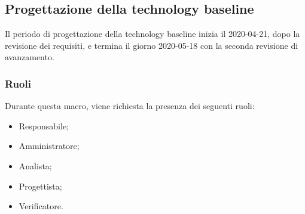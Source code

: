 \documentclass[../piano-di-progetto.tex]{subfiles}
\begin{document}
\subsection{Progettazione della technology baseline}
Il periodo di progettazione della technology baseline inizia il 2020-04-21, dopo la revisione dei requisiti, e termina il giorno 2020-05-18 con la seconda revisione di avanzamento. 

\subsubsection{Ruoli}
Durante questa macro, viene richiesta la presenza dei seguenti ruoli:
\begin{itemize}
    \item Responsabile;
    \item Amministratore;
    \item Analista;
    \item Progettista;
    \item Verificatore.
\end{itemize}
\end{document}
